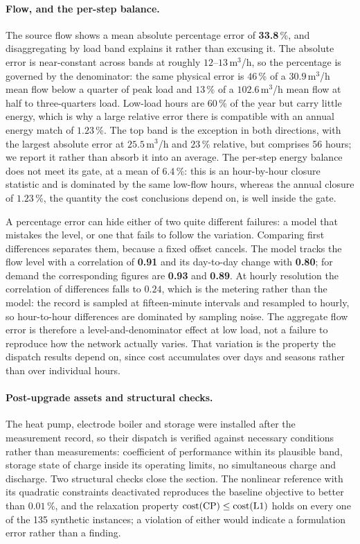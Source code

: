 \paragraph{Flow, and the per-step balance.}
The source flow shows a mean absolute percentage error of \textbf{33.8}\,\%, and
disaggregating by load band explains it rather than excusing it. The absolute error is
near-constant across bands at roughly $12$--$13$\,m$^3$/h, so the percentage is governed by
the denominator: the same physical error is $46$\,\% of a $30.9$\,m$^3$/h mean flow below a
quarter of peak load and $13$\,\% of a $102.6$\,m$^3$/h mean flow at half to three-quarters
load. Low-load hours are $60$\,\% of the year but carry little energy, which is why a large
relative error there is compatible with an annual energy match of $1.23$\,\%. The top band
is the exception in both directions, with the largest absolute error at $25.5$\,m$^3$/h and
$23$\,\% relative, but comprises 56 hours; we report it rather than absorb it into an
average. The per-step energy balance does not meet its gate, at a mean of $6.4$\,\%: this is
an hour-by-hour closure statistic and is dominated by the same low-flow hours, whereas the
annual closure of $1.23$\,\%, the quantity the cost conclusions depend on, is well
inside the gate.

A percentage error can hide either of two quite different failures: a model that mistakes
the level, or one that fails to follow the variation. Comparing first differences separates
them, because a fixed offset cancels. The model tracks the flow level with a correlation of
\textbf{0.91} and its day-to-day change with \textbf{0.80}; for demand the corresponding
figures are \textbf{0.93} and \textbf{0.89}. At hourly resolution the correlation of
differences falls to $0.24$, which is the metering rather than the model: the record is
sampled at fifteen-minute intervals and resampled to hourly, so hour-to-hour differences are
dominated by sampling noise. The aggregate flow error is therefore a level-and-denominator
effect at low load, not a failure to reproduce how the network actually varies. That
variation is the property the dispatch results depend on, since cost accumulates over days
and seasons rather than over individual hours.

\paragraph{Post-upgrade assets and structural checks.}
The heat pump, electrode boiler and storage were installed after the measurement record, so
their dispatch is verified against necessary conditions rather than measurements:
coefficient of performance within its plausible band, storage state of charge inside its
operating limits, no simultaneous charge and discharge. Two structural checks close the
section. The nonlinear reference with its quadratic constraints deactivated reproduces the
baseline objective to better than $0.01$\,\%, and the relaxation property
$\mathrm{cost}(\mathrm{CP}) \le \mathrm{cost}(\mathrm{L1})$ holds on every one of the 135 synthetic
instances; a violation of either would indicate a formulation error rather than a finding.
